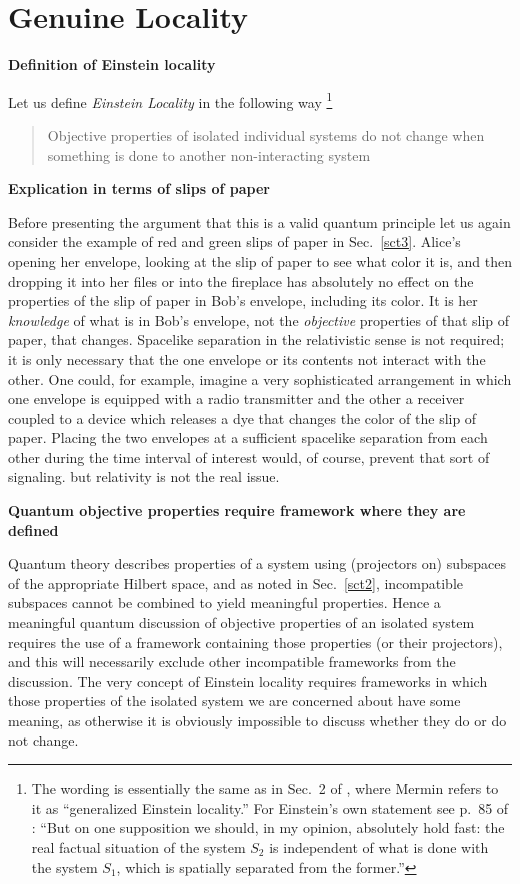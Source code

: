 \documentclass[10pt]{article} %
\def\outl#1{\par{\medskip\noindent\hspace*{.5cm}\bf
      \mathversion{bold}#1\mathversion{normal}\smallskip} }
\def\np{} \def\xa{} \def\xb{} \def\xn{} \def\xp{}
\def\outl#1{} \def\np{} \def\xa{} \def\xb{} \def\xn{} \def\xp{}
\def\outl#1{\par{\medskip\noindent\hspace*{.5cm}\bf
      \mathversion{bold}#1\mathversion{normal}\smallskip} }
\def\np{\newpage }\def\xn{\nopagebreak }\def\xp{\pagebreak }
\begin{document}
\xb
\section{Genuine Locality}
\label{sct6}
\xa

\xb
\outl{Definition of Einstein locality}
\xa


Let us define \emph{Einstein Locality} in the following way%
\footnote{The wording is essentially the same as in Sec.~2 of \cite{Mrmn98},
  where Mermin refers to it as ``generalized Einstein locality.''  For
  Einstein's own statement see p.~85 of \cite{Enst51}: ``But on one
  supposition we should, in my opinion, absolutely hold fast: the real factual
  situation of the system $S_2$ is independent of what is done with the system
  $S_1$, which is spatially separated from the former.''} %


\begin{quote}

Objective properties of isolated individual systems do not change when 
something is done to another non-interacting system
\end{quote}

\xb
\outl{Explication in terms of slips of paper}
\xa


Before presenting the argument that this is a valid quantum principle let us
again  consider the example of red and green slips of paper
in Sec.~\ref{sct3}.  Alice's opening her envelope, looking at the slip of
paper to see what color it is, and then dropping it into her files or into the
fireplace has absolutely no effect on the properties of the slip of paper in
Bob's envelope, including its color.  It is her \emph{knowledge} of what is in
Bob's envelope, not the \emph{objective} properties of that slip of paper, that
changes.  Spacelike separation in the relativistic sense is not required; it
is only necessary that the one envelope or its contents not interact with the
other.  One could, for example, imagine a very sophisticated arrangement in
which one envelope is equipped with a radio transmitter and the other a
receiver coupled to a device which releases a dye that changes the color of
the slip of paper.  Placing the two envelopes at a sufficient spacelike
separation from each other during the time interval of interest would, of
course, prevent that sort of signaling. but relativity is not the real issue.

\xb
\outl{Quantum objective properties require framework where they are defined}
\xa


Quantum theory describes properties of a system using (projectors on)
subspaces of the appropriate Hilbert space, and as noted in Sec.~\ref{sct2},
incompatible subspaces cannot be combined to yield meaningful
properties. Hence a meaningful quantum discussion of objective properties of
an isolated system requires the use of a framework containing those
properties (or their projectors), and this will necessarily exclude other
incompatible frameworks from the discussion. The very concept of Einstein
locality requires frameworks in which those properties of the isolated system
we are concerned about have some meaning, as otherwise it is obviously
impossible to discuss whether they do or do not change.
\end{document}
